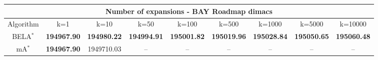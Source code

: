 \begin{tabular}{c|cccccccc}\toprule
\multicolumn{9}{c}{Number of expansions - BAY Roadmap dimacs}\\ \midrule
Algorithm & k=1 & k=10 & k=50 & k=100 & k=500 & k=1000 & k=5000 & k=10000 \\ \midrule
BELA$^*$ & \textbf{194967.90} & \textbf{194980.22} & \textbf{194994.91} & \textbf{195001.82} & \textbf{195019.96} & \textbf{195028.84} & \textbf{195050.65} & \textbf{195060.48} \\
mA$^*$ & \textbf{194967.90} & 1949710.03 & -- & -- & -- & -- & -- & -- \\ \bottomrule 
\end{tabular}
